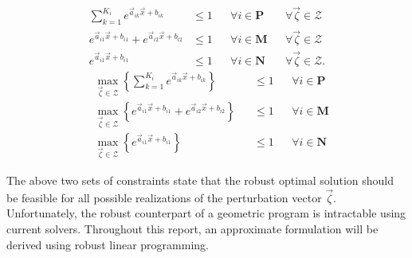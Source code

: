 \begin{multicols}{2}
\begin{equation}
\begin{aligned}
\textstyle{\sum}_{k=1}^{K_i}e^{\vec{a}_{ik}\vec{x} + b_{ik}} &\leq 1 &&\forall i \in \mathbf{P} && \forall \vec{\zeta} \in \mathcal{Z}\\
e^{\vec{a}_{i1}\vec{x} + b_{i1}} + e^{\vec{a}_{i2}\vec{x} + b_{i2}} &\leq 1 &&\forall i \in \mathbf{M} && \forall \vec{\zeta} \in \mathcal{Z}\\
e^{\vec{a}_{i1}\vec{x} + b_{i1}} &\leq 1 &&\forall i \in \mathbf{N} && \forall \vec{\zeta} \in \mathcal{Z}.
\end{aligned}
\label{GP_counterparts}
\end{equation}\break
\begin{equation}
\begin{aligned}
&\max_{\vec{\zeta} \in \mathcal{Z}} \left\{\textstyle{\sum}_{k=1}^{K_i}e^{\vec{a}_{ik}\vec{x} + b_{ik}}\right\} &&\leq 1 &&\forall i \in \mathbf{P}\\
&\max_{\vec{\zeta} \in \mathcal{Z}} \left\{e^{\vec{a}_{i1}\vec{x} + b_{i1}} + e^{\vec{a}_{i2}\vec{x} + b_{i2}}\right\} &&\leq 1 &&\forall i \in \mathbf{M}\\
&\max_{\vec{\zeta} \in \mathcal{Z}} \left\{e^{\vec{a}_{i1}\vec{x} + b_{i1}}\right\} &&\leq 1 &&\forall i \in \mathbf{N}
\end{aligned}
\label{GP_counterparts_finite}
\end{equation}
\end{multicols}

The above two sets of constraints state that the robust optimal solution should be
feasible for all possible realizations of the perturbation vector $\vec{\zeta}$.
Unfortunately, the robust counterpart of a geometric program is intractable using current solvers.
Throughout this report, an approximate formulation will be derived using robust linear programming.\\ [12pt]

